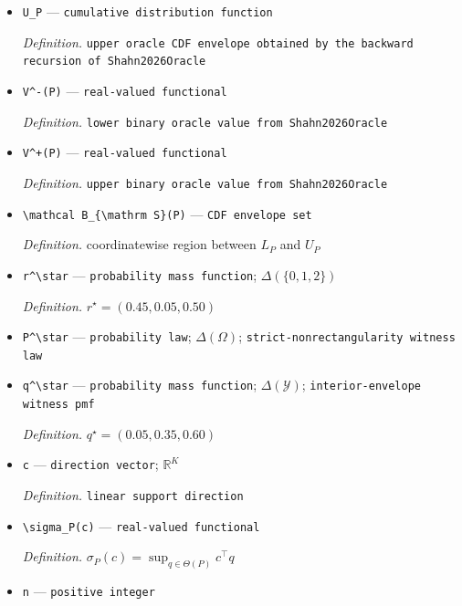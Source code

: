 \documentclass{article}
\begin{document}
\begin{itemize}
  \item \texttt{U\_\allowbreak{}P} --- \texttt{cumulative distribution function}
  \par\smallskip\noindent\emph{Definition.} \texttt{upper oracle CDF envelope obtained by the backward recursion of Shahn2026Oracle}
  \item \texttt{V\textasciicircum{}-\allowbreak{}(P)} --- \texttt{real-\allowbreak{}valued functional}
  \par\smallskip\noindent\emph{Definition.} \texttt{lower binary oracle value from Shahn2026Oracle}
  \item \texttt{V\textasciicircum{}+\allowbreak{}(P)} --- \texttt{real-\allowbreak{}valued functional}
  \par\smallskip\noindent\emph{Definition.} \texttt{upper binary oracle value from Shahn2026Oracle}
  \item \texttt{\textbackslash{}\allowbreak{}mathcal B\_\allowbreak{}\{\textbackslash{}\allowbreak{}mathrm S\}\allowbreak{}(P)} --- \texttt{CDF envelope set}
  \par\smallskip\noindent\emph{Definition.} coordinatewise region between \(L_P\) and \(U_P\)
  \item \texttt{r\textasciicircum{}\textbackslash{}\allowbreak{}star} --- \texttt{probability mass function}; \(\Delta(\{0,1,2\})\)
  \par\smallskip\noindent\emph{Definition.} \(r^\star=(0.45,0.05,0.50)\)
  \item \texttt{P\textasciicircum{}\textbackslash{}\allowbreak{}star} --- \texttt{probability law}; \(\Delta(\Omega)\); \texttt{strict-\allowbreak{}nonrectangularity witness law}
  \item \texttt{q\textasciicircum{}\textbackslash{}\allowbreak{}star} --- \texttt{probability mass function}; \(\Delta(\mathcal Y)\); \texttt{interior-\allowbreak{}envelope witness pmf}
  \par\smallskip\noindent\emph{Definition.} \(q^\star=(0.05,0.35,0.60)\)
  \item \texttt{c} --- \texttt{direction vector}; \(\mathbb R^K\)
  \par\smallskip\noindent\emph{Definition.} \texttt{linear support direction}
  \item \texttt{\textbackslash{}\allowbreak{}sigma\_\allowbreak{}P(c)} --- \texttt{real-\allowbreak{}valued functional}
  \par\smallskip\noindent\emph{Definition.} \(\sigma_P(c)=\sup_{q\in\Theta(P)}c^\top q\)
  \item \texttt{n} --- \texttt{positive integer}

\end{itemize}
\end{document}
